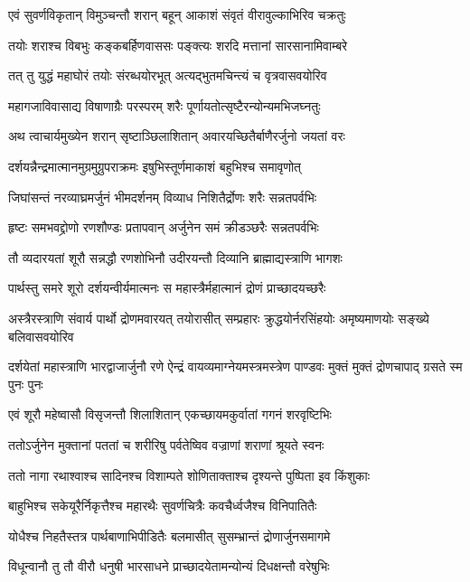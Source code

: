 \twolineshloka
{एवं सुवर्णविकृतान् विमुञ्चन्तौ शरान् बहून्}
{आकाशं संवृतं वीरावुल्काभिरिव चक्रतुः}


\twolineshloka
{तयोः शराश्च विबभुः कङ्कबर्हिणवाससः}
{पङ्क्त्यः शरदि मत्तानां सारसानामिवाम्बरे}


\twolineshloka
{तत् तु युद्धं महाघोरं तयोः संरब्धयोरभूत्}
{अत्यद्भुतमचिन्त्यं च वृत्रवासवयोरिव}


\twolineshloka
{महागजाविवासाद्य विषाणाग्रैः परस्परम्}
{शरैः पूर्णायतोत्सृष्टैरन्योन्यमभिजघ्नतुः}


\twolineshloka
{अथ त्वाचार्यमुख्येन शरान् सृष्टाञ्छिलाशितान्}
{अवारयच्छितैर्बाणैरर्जुनो जयतां वरः}


\twolineshloka
{दर्शयन्नैन्द्रमात्मानमुग्रमुग्रुपराक्रमः}
{इषुभिस्तूर्णमाकाशं बहुभिश्च समावृणोत्}



\twolineshloka
{जिघांसन्तं नरव्याघ्रमर्जुनं भीमदर्शनम्}
{विव्याध निशितैर्द्रोणः शरैः सन्नतपर्वभिः}


\twolineshloka
{हृष्टः समभवद्द्रोणो रणशौण्डः प्रतापवान्}
{अर्जुनेन समं क्रीडञ्छरैः सन्नतपर्वभिः}


\twolineshloka
{तौ व्यदारयतां शूरौ सन्नद्धौ रणशोभिनौ}
{उदीरयन्तौ दिव्यानि ब्राह्माद्यस्त्राणि भागशः}


\twolineshloka
{पार्थस्तु समरे शूरो दर्शयन्वीर्यमात्मनः}
{स महास्त्रैर्महात्मानं द्रोणं प्राच्छादयच्छरैः}


\onelineshloka
{अस्त्रैरस्त्राणि संवार्य पार्थो द्रोणमवारयत्}
\twolineshloka
{तयोरासीत् सम्प्रहारः क्रुद्धयोर्नरसिंहयोः}
{अमृष्यमाणयोः सङ्ख्ये बलिवासवयोरिव}


\onelineshloka
{दर्शयेतां महास्त्राणि भारद्वाजार्जुनौ रणे}
\twolineshloka
{ऐन्द्रं वायव्यमाग्नेयमस्त्रमस्त्रेण पाण्डवः}
{मुक्तं मुक्तं द्रोणचापाद् ग्रसते स्म पुनः पुनः}


\twolineshloka
{एवं शूरौ महेष्वासौ विसृजन्तौ शिलाशितान्}
{एकच्छायमकुर्वातां गगनं शरवृष्टिभिः}


\twolineshloka
{ततोऽर्जुनेन मुक्तानां पततां च शरीरिषु}
{पर्वतेष्विव वज्राणां शराणां श्रूयते स्वनः}


\twolineshloka
{ततो नागा रथाश्वाश्च सादिनश्च विशाम्पते}
{शोणिताक्ताश्च दृश्यन्ते पुष्पिता इव किंशुकाः}


\twolineshloka
{बाहुभिश्च सकेयूरैर्निकृत्तैश्च महारथैः}
{सुवर्णचित्रैः कवचैर्ध्वजैश्च विनिपातितैः}


\twolineshloka
{योधैश्च निहतैस्तत्र पार्थबाणाभिपीडितैः}
{बलमासीत् सुसम्भ्रान्तं द्रोणार्जुनसमागमे}


\twolineshloka
{विधून्वानौ तु तौ वीरौ धनुषी भारसाधने}
{प्राच्छादयेतामन्योन्यं दिधक्षन्तौ वरेषुभिः}



